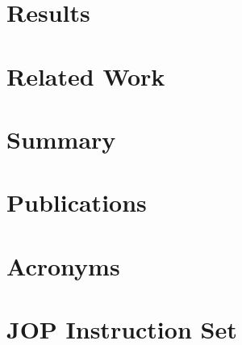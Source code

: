 %    

\chapter{Results}

\label{chap:results}
    

\chapter{Related Work}
\label{chap:related}

    


\chapter{Summary}
\label{chap:conclusions}
    





\appendix
 \ihead{\leftmark} %

\chapter{Publications}
    

\chapter{Acronyms}
 \label{appx:acro}



\chapter{JOP Instruction Set} \label{appx:jop:instr}


